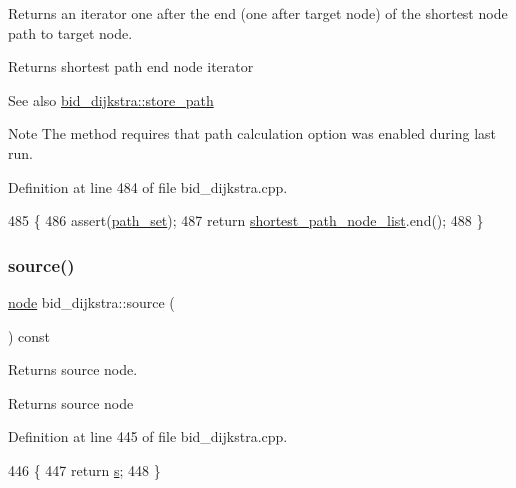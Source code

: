Returns an iterator one after the end (one after target node) of the shortest node path to target node. 

\begin{DoxyReturn}{Returns}
shortest path end node iterator
\end{DoxyReturn}
\begin{DoxySeeAlso}{See also}
\mbox{\hyperlink{classbid__dijkstra_a0032d9b44c8b3f6f5733ff3ef94cf169}{bid\+\_\+dijkstra\+::store\+\_\+path}}
\end{DoxySeeAlso}
\begin{DoxyNote}{Note}
The method requires that path calculation option was enabled during last run. 
\end{DoxyNote}


Definition at line 484 of file bid\+\_\+dijkstra.\+cpp.


\begin{DoxyCode}
485 \{
486     assert(\mbox{\hyperlink{classbid__dijkstra_aa7b329f69600fffae2753f87501dab9d}{path\_set}});
487     \textcolor{keywordflow}{return} \mbox{\hyperlink{classbid__dijkstra_a70041b0a90fb840e141126fe7a6119db}{shortest\_path\_node\_list}}.end();
488 \}
\end{DoxyCode}
\mbox{\label{classbid__dijkstra_ae8f5268e008b003e38f25c83ed3fd138}} 
\subsubsection{\texorpdfstring{source()}{source()}}
{\footnotesize\ttfamily \mbox{\hyperlink{classnode}{node}} bid\+\_\+dijkstra\+::source (\begin{DoxyParamCaption}{ }\end{DoxyParamCaption}) const}



Returns source node. 

\begin{DoxyReturn}{Returns}
source node 
\end{DoxyReturn}


Definition at line 445 of file bid\+\_\+dijkstra.\+cpp.


\begin{DoxyCode}
446 \{
447     \textcolor{keywordflow}{return} \mbox{\hyperlink{classbid__dijkstra_a118e2ebd0d08ffc991c2bc578f8284a4}{s}};
448 \}
\end{DoxyCode}
\mbox{\label{classbid__dijkstra_a25dfbd432043e2e642e4dc71f4cb3208}} 
